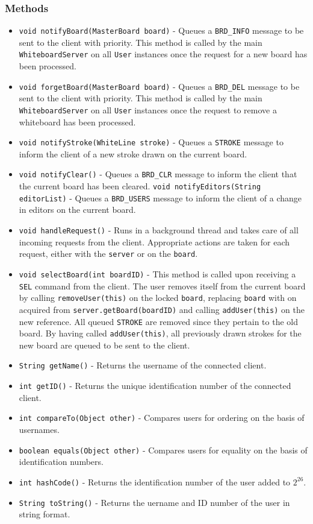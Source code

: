 \subsubsection{Methods}
\begin{itemize}
\item \texttt{void notifyBoard(MasterBoard board)} - Queues a \texttt{BRD\_INFO} message to be sent to the client with priority. This method is called by the main \texttt{WhiteboardServer} on all \texttt{User} instances once the request for a new board has been processed.
\item \texttt{void forgetBoard(MasterBoard board)} - Queues a \texttt{BRD\_DEL} message to be sent to the client with priority. This method is called by the main \texttt{WhiteboardServer} on all \texttt{User} instances once the request to remove a whiteboard has been processed.
\item \texttt{void notifyStroke(WhiteLine stroke)} - Queues a \texttt{STROKE} message to inform the client of a new stroke drawn on the current board.
\item \texttt{void notifyClear()} - Queues a \texttt{BRD\_CLR} message to inform the client that the current board has been cleared.
\texttt{void notifyEditors(String editorList)} - Queues a \texttt{BRD\_USERS} message to inform the client of a change in editors on the current board.
\item \texttt{void handleRequest()} - Runs in a background thread and takes care of all incoming requests from the client. Appropriate actions are taken for each request, either with the \texttt{server} or on the \texttt{board}.
\item \texttt{void selectBoard(int boardID)} - This method is called upon receiving a \texttt{SEL} command from the client. The user removes itself from the current board by calling \texttt{removeUser(this)} on the locked \texttt{board}, replacing \texttt{board} with on acquired from \texttt{server.getBoard(boardID)} and calling \texttt{addUser(this)} on the new reference. All queued \texttt{STROKE} are removed since they pertain to the old board. By having called \texttt{addUser(this)}, all previously drawn strokes for the new board are queued to be sent to the client.
\item \texttt{String getName()} - Returns the username of the connected client.
\item \texttt{int getID()} - Returns the unique identification number of the connected client.
\item \texttt{int compareTo(Object other)} - Compares users for ordering on the basis of usernames.
\item \texttt{boolean equals(Object other)} - Compares users for equality on the basis of identification numbers.
\item \texttt{int hashCode()} - Returns the identification number of the user added to $2^{26}$.
\item \texttt{String toString()} - Returns the uername and ID number of the user in string format.
\end{itemize}


